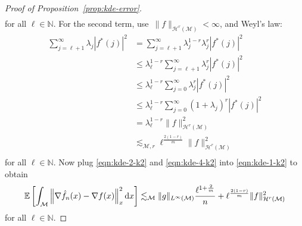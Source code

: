 \documentclass[preprint]{imsart}
\theoremstyle{plain}
\theoremstyle{definition}
\newcommand{\Nbb}{\mathbb{N}}
\newcommand{\Ebb}{\mathbb{E}}
\newcommand{\Mcal}{\mathcal{M}}
\newcommand{\Hcal}{\mathcal{H}}
\newcommand{\diff}{\textnormal{d}}
\begin{document}
\begin{appendix}
\begin{proof}[Proof of Proposition~\ref{prop:kde-error}]
\begin{equation}
\begin{split}
        \end{split}
    \end{equation}
    for all $\ell\in\Nbb$.
    For the second term, use~$\|f\|_{\Hcal^r(\Mcal)}<\infty$, and Weyl's law:   \begin{equation}\label{eqn:kde-2-k2}
        \begin{split}
            \sum_{j= \ell+1}^{\infty}\lambda_j|f^{\ast}(j)|^2 &= \sum_{j= \ell+1}^{\infty}\lambda_j^{1-r}\lambda_{j}^{r}|f^{\ast}(j)|^2 \\
            &\le \lambda_{\ell}^{1-r}\sum_{j= \ell+1}^{\infty}\lambda_{j}^{r}|f^{\ast}(j)|^2 \\
            &\le \lambda_{\ell}^{1-r}\sum_{j=0}^{\infty}\lambda_{j}^{r}|f^{\ast}(j)|^2 \\
            &\le \lambda_{\ell}^{1-r}\sum_{j=0}^{\infty}(1+\lambda_{j})^{r}|f^{\ast}(j)|^2 \\
            &= \lambda_{\ell}^{1-r}\|f\|_{\Hcal^r(\Mcal)}^2 \\            &\lesssim_{\Mcal,r} \ell^{\frac{2(1-r)}{m}}\|f\|_{\Hcal^r(\Mcal)}^2 \\
        \end{split}
    \end{equation}
    for all $\ell\in\Nbb$.
    Now plug \eqref{eqn:kde-2-k2} and \eqref{eqn:kde-4-k2} into \eqref{eqn:kde-1-k2} to obtain
    \begin{equation}\label{eqn:kde-k2}
        \Ebb\left[\int_{\Mcal}\left\|\nabla\hat{f}_n(x)-\nabla f(x)\right\|_x^2\diff x\right] \lesssim_{\Mcal} \|g\|_{L^\infty(\Mcal)}\frac{\ell^{1+\frac{2}{m}}}{n} + \ell^{\frac{2(1-r)}{m}}\|f\|_{\Hcal^r(\Mcal)}^2 
    \end{equation}
    for all $\ell\in\Nbb$.


\end{proof}
\end{appendix}
\end{document}
